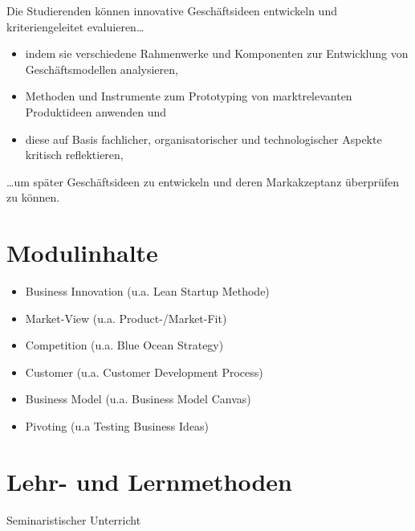 Die Studierenden können innovative Geschäftsideen entwickeln und
kriteriengeleitet evaluieren\ldots{}

\begin{itemize}
\tightlist
\item
  indem sie verschiedene Rahmenwerke und Komponenten zur Entwicklung von
  Geschäftsmodellen analysieren,
\item
  Methoden und Instrumente zum Prototyping von marktrelevanten
  Produktideen anwenden und
\item
  diese auf Basis fachlicher, organisatorischer und technologischer
  Aspekte kritisch reflektieren,
\end{itemize}

\ldots um später Geschäftsideen zu entwickeln und deren Markakzeptanz
überprüfen zu können.

\hypertarget{modulinhaltepathlabel....srcmodulbeschreibungen-bachelor-bpo5ba_product-dimensions}{%
\section*{Modulinhalte\label{../../src/modulbeschreibungen-bachelor-bpo5/BA_Product-Dimensions}}\label{modulinhaltepathlabel....srcmodulbeschreibungen-bachelor-bpo5ba_product-dimensions}}

\begin{itemize}
\tightlist
\item
  Business Innovation (u.a. Lean Startup Methode)
\item
  Market-View (u.a. Product-/Market-Fit)
\item
  Competition (u.a. Blue Ocean Strategy)
\item
  Customer (u.a. Customer Development Process)
\item
  Business Model (u.a. Business Model Canvas)
\item
  Pivoting (u.a Testing Business Ideas)
\end{itemize}

\hypertarget{lehr--und-lernmethodenpathlabel....srcmodulbeschreibungen-bachelor-bpo5ba_product-dimensions}{%
\section*{Lehr- und
Lernmethoden\label{../../src/modulbeschreibungen-bachelor-bpo5/BA_Product-Dimensions}}\label{lehr--und-lernmethodenpathlabel....srcmodulbeschreibungen-bachelor-bpo5ba_product-dimensions}}

Seminaristischer Unterricht

